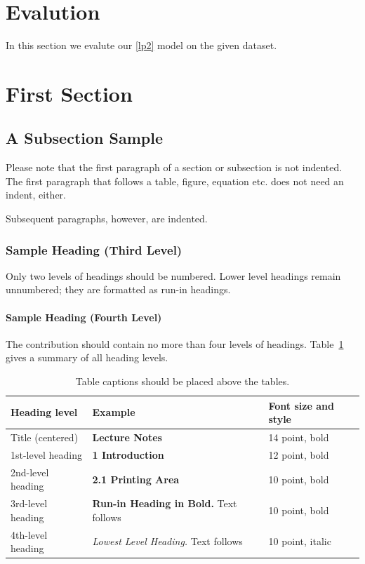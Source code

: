 \documentclass{llncs}
\begin{document}
\section{Evalution}
In this section we evalute our \ref{lp2} model on the given dataset.

\section{First Section}
	\subsection{A Subsection Sample}
	Please note that the first paragraph of a section or subsection is
	not indented. The first paragraph that follows a table, figure,
	equation etc. does not need an indent, either.
	
	Subsequent paragraphs, however, are indented.
	
	\subsubsection{Sample Heading (Third Level)} Only two levels of
	headings should be numbered. Lower level headings remain unnumbered;
	they are formatted as run-in headings.
	
	\paragraph{Sample Heading (Fourth Level)}
	The contribution should contain no more than four levels of
	headings. Table~\ref{tab1} gives a summary of all heading levels.
	
	\begin{table}
		\caption{Table captions should be placed above the
			tables.}\label{tab1}
		\begin{tabular}{|l|l|l|}
			\hline
			Heading level &  Example & Font size and style\\
			\hline
			Title (centered) &  {\Large\bfseries Lecture Notes} & 14 point, bold\\
			1st-level heading &  {\large\bfseries 1 Introduction} & 12 point, bold\\
			2nd-level heading & {\bfseries 2.1 Printing Area} & 10 point, bold\\
			3rd-level heading & {\bfseries Run-in Heading in Bold.} Text follows & 10 point, bold\\
			4th-level heading & {\itshape Lowest Level Heading.} Text follows & 10 point, italic\\
			\hline
		\end{tabular}
	\end{table}
	
\end{document}
